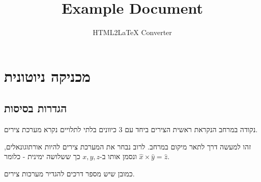 \documentclass{tstextbook}
\begin{document}
\title{Example Document}
\author{HTML2LaTeX Converter}
\maketitle

\section{מכניקה ניוטונית}

\subsection{הגדרות בסיסות}

\begin{definition}
נקודה במרחב הנקראת ראשית הצירים ביחד עם 3 כיוונים בלתי לתלויים נקרא מערכת צירים.

\end{definition}
זהו למעשה דרך לתאר מיקום במרחב. לרוב נבחר את המערכת צירים להיות אורתוגונאלים, ונסמן אותו ב-\(x,y,z\) כך ששלושה ימינית - כלומר \(\hat{x} \times \hat{y} = \hat{z}\).

כמובן שיש מספר דרכים להגדיר מערכות צירים.
\end{document}
